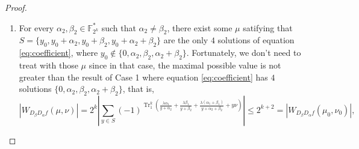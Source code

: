 \documentclass{article}
\newcommand{\F}{\mathbb{F}}
\newcommand{\0}{\textbf{0}}
\newcommand{\1}{\textbf{1}}
\newcommand{\TRACE}{\operatorname{Tr}_1^k}
\theoremstyle{plain}
\newtheorem{remark}{Remark}
\theoremstyle{nonumberplain}
\begin{document}
\begin{proof}
\begin{enumerate}[label=\textbf{Case \arabic*}]
\begin{enumerate}[label=\textbf{Case \Alph{*}},itemindent=*,wide=\parindent]
    \begin{remark}
        There must exist some points $ \alpha,\beta $ 
        such that $ \max_{\mu,\nu}|W_{D_{\beta}D_{\alpha}f}(\mu,\nu)|=2^{k+3} $.
        Indeed, the conditions $ \alpha_2,\beta_2\in\F_{2^k}^* $, $ \alpha_2\ne\beta_2 $ and $ \mu\ne 0 $ 
        can tell us $ \mu(\alpha_2^2\beta_2+\alpha_2\beta_2^2)\ne 0 $, 
        resulting in $ \lambda(\alpha_2^2+\beta_2^2+\alpha_2\beta_2)\ne 0 $, 
        which implies $ \frac{\beta_2}{\alpha_2}\notin\F_4 $.
        So take $ \mu=\lambda(\alpha_2^2+\beta_2^2+\alpha_2\beta_2)/(\alpha_2^2\beta_2+\alpha_2\beta_2^2) $ 
        into $ \TRACE\left(\frac{\lambda\alpha_2}{\mu\beta_2(\alpha_2+\beta_2)}\right)=0 $ 
        and $ \TRACE\left(\frac{\lambda\beta_2}{\mu\alpha_2(\alpha_2+\beta_2)}\right)=0 $ respectively, 
        we can transform two equations into $ \TRACE\left(\frac{1}{\gamma^2+\gamma+1}\right)=0 $ 
        and $ \TRACE\left(\frac{\gamma^2}{\gamma^2+\gamma+1}\right)=0 $, 
        where $ \gamma=\frac{\beta_2}{\alpha_2}\in\F_{2^k}\setminus\F_{4} $. 
        Furthermore, according to Lemma \ref{L:SumInv00}, 
        the number of $ \gamma=\frac{\beta_2}{\alpha_2}\in\F_{2^k}\setminus\F_{4} $ satisfying 
        $ \TRACE\left(\frac{1}{\gamma^2+\gamma+1}\right)=0 $ and $ \TRACE\left(\frac{\gamma^2}{\gamma^2+\gamma+1}\right)=0 $ 
        is $ L $, which means that for points $ \alpha=(\alpha_1,\alpha_2)\in\F_{2^k}^2 $ with $ \alpha_2\ne 0 $, there exist 
        $ L $ $ \beta_2 $ such that $ \max_{\mu,\nu}|W_{D_{\beta}D_{\alpha}f}(\mu,\nu)|=2^{k+3} $. 
    \end{remark}
\end{enumerate}
\item     
    For every $ \alpha_2,\beta_2\in\F_{2^k}^* $ such that $ \alpha_2\ne\beta_2 $, 
    there exist some $ \mu $ satifying that $ S=\{y_0,y_0+\alpha_2,y_0+\beta_2,y_0+\alpha_2+\beta_2\} $ 
    are the only $ 4 $ solutions of 
    equation \eqref{eq:coefficient}, where $ y_0\notin\{0, \alpha_2, \beta_2, \alpha_2+\beta_2\} $. Fortunately, 
    we don't need to treat with those $ \mu $ since in that case, 
    the maximal possible value is not greater than the result of Case 1 where equation \eqref{eq:coefficient} has $ 4 $ solutions 
    $ \{0,\alpha_2,\beta_2,\alpha_2+\beta_2\} $, that is, 
    \[ |W_{D_{\beta}D_{\alpha}f}(\mu,\nu)|=2^k\left\lvert\sum_{y\in S}(-1)^{\TRACE\left(\frac{\lambda\alpha_1}{y+\alpha_2}+\frac{\lambda\beta_1}{y+\beta_2}+\frac{\lambda(\alpha_1+\beta_1)}{y+\alpha_2+\beta_2}+ y\nu\right)}\right\rvert\le 2^{k+2}=|W_{D_{\beta}D_{\alpha}f}(\mu_0,\nu_0)|, \]   

\end{enumerate}
\end{proof}
\end{document}
